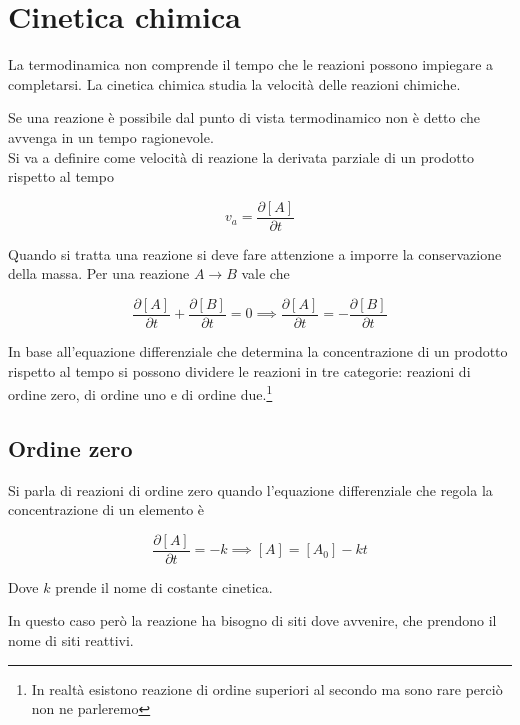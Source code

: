 \chapter{Cinetica chimica}

La termodinamica non comprende il tempo che le reazioni possono impiegare a completarsi. La cinetica chimica studia la velocità delle reazioni chimiche. 

Se una reazione è possibile dal punto di vista termodinamico non è detto che avvenga in un tempo ragionevole.\\

Si va a definire come velocità di reazione la derivata parziale di un prodotto rispetto al tempo 

\begin{equation}
    v_a = \frac{\partial [ A ]}{\partial t}
\end{equation}

Quando si tratta una reazione si deve fare attenzione a imporre la conservazione della massa. Per una reazione $A \to B$ vale che 

\begin{equation}
    \frac{\partial [A]}{\partial t} + \frac{\partial [B]}{\partial t} = 0 \implies \frac{\partial [A]}{\partial t} = - \frac{\partial [B]}{\partial t}
\end{equation}

In base all'equazione differenziale che determina la concentrazione di un prodotto rispetto al tempo si possono dividere le reazioni in tre categorie: reazioni di ordine zero, di ordine uno e di ordine due.\footnote{In realtà esistono reazione di ordine superiori al secondo ma sono rare perciò non ne parleremo}

\section{Ordine zero}

Si parla di reazioni di ordine zero quando l'equazione differenziale che regola la concentrazione di un elemento è

\begin{equation}
    \frac{\partial [A]}{\partial t} = - k \implies [A] = [A_0] - kt
\end{equation}

Dove $k$ prende il nome di costante cinetica.

In questo caso però la reazione ha bisogno di siti dove avvenire, che prendono il nome di siti reattivi. \\

